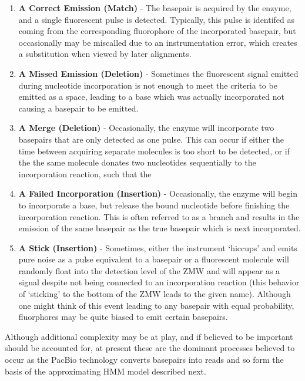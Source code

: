 \documentclass[fleqn,10pt]{SelfArx} %
\begin{document}
\begin{enumerate}
  \item \textbf{A Correct Emission (Match)} - The basepair is acquired by the enzyme, and a single fluorescent pulse is detected.  Typically, this pulse is identifed as coming from the corresponding fluorophore of the incorporated basepair, but occasionally may be miscalled due to an instrumentation error, which creates a substitution when viewed by later alignments.
  
  \item \textbf{A Missed Emission (Deletion)} - Sometimes the fluorescent signal emitted during nucleotide incorporation is not enough to meet the criteria to be emitted as a space, leading to a base which was actually incorporated not causing a basepair to be emitted.
  
    \item \textbf{A Merge (Deletion) } - Occasionally, the enzyme will incorporate two basepairs that are only detected as one pulse.  This can occur if either the time between acquiring separate molecules is too short to be detected, or if the the same molecule donates two nucleotides sequentially to the incorporation reaction, such that the 
   
  
  \item \textbf{A Failed Incorporation (Insertion) } - Occasionally, the enzyme will begin to incorporate a base, but release the bound nucleotide before finishing the incorporation reaction.  This is often referred to as a branch and results in the emission of the same basepair as the true basepair which is next incorporated.
  
  \item \textbf{A Stick (Insertion) } - Sometimes, either the instrument `hiccups' and emits pure noise as a pulse equivalent to a basepair or a fluorescent molecule will randomly float into the detection level of the ZMW and will appear as a signal despite not being connected to an incorporation reaction (this behavior of `sticking' to the bottom of the ZMW leads to the given name).  Although one might think of this event leading to any basepair with equal probability, fluorphores may be quite biased to emit certain basepairs.
     
\end{enumerate}


Although additional complexity may be at play, and if believed to be important should be accounted for, at present these are the dominant processes believed to occur as the PacBio technology converts basepairs into reads and so form the basis of the approximating HMM model described next.
\end{document}
